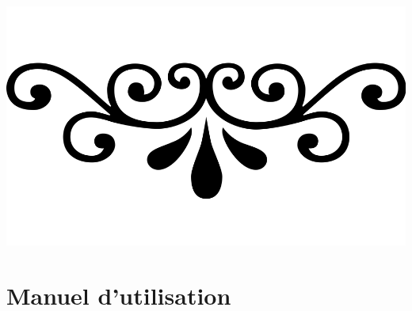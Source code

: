 \documentclass{report}
\begin{document}
	\begin{center}
	\includegraphics[scale=0.1]{img/fioritures.png} 
	\end{center} 
	
	\chapter{Manuel d'utilisation}
	
	
	
	
\end{document}
